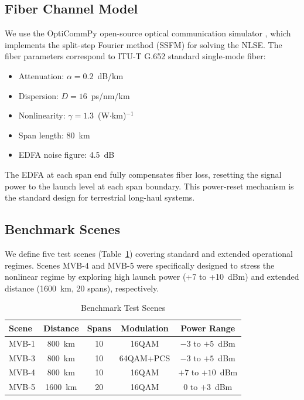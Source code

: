 \documentclass[conference]{IEEEtran}
\begin{document}
\subsection{Fiber Channel Model}

We use the OptiCommPy open-source optical communication simulator \cite{silva2024opticommpy}, which implements the split-step Fourier method (SSFM) for solving the NLSE. The fiber parameters correspond to ITU-T G.652 standard single-mode fiber:
\begin{itemize}
    \item Attenuation: $\alpha = 0.2$~dB/km
    \item Dispersion: $D = 16$~ps/nm/km
    \item Nonlinearity: $\gamma = 1.3$~(W$\cdot$km)$^{-1}$
    \item Span length: 80~km
    \item EDFA noise figure: 4.5~dB
\end{itemize}

The EDFA at each span end fully compensates fiber loss, resetting the signal power to the launch level at each span boundary. This power-reset mechanism is the standard design for terrestrial long-haul systems.

\subsection{Benchmark Scenes}

We define five test scenes (Table~\ref{tab:scenes}) covering standard and extended operational regimes. Scenes MVB-4 and MVB-5 were specifically designed to stress the nonlinear regime by exploring high launch power (+7 to +10~dBm) and extended distance (1600~km, 20 spans), respectively.

\begin{table}[htbp]
\caption{Benchmark Test Scenes}
\label{tab:scenes}
\begin{center}
\begin{tabular}{lcccc}
\toprule
Scene & Distance & Spans & Modulation & Power Range \\
\midrule
MVB-1 & 800~km & 10 & 16QAM & $-3$ to $+5$~dBm \\
MVB-3 & 800~km & 10 & 64QAM+PCS & $-3$ to $+5$~dBm \\
MVB-4 & 800~km & 10 & 16QAM & $+7$ to $+10$~dBm \\
MVB-5 & 1600~km & 20 & 16QAM & $0$ to $+3$~dBm \\
\bottomrule
\end{tabular}
\end{center}
\end{table}
\end{document}
